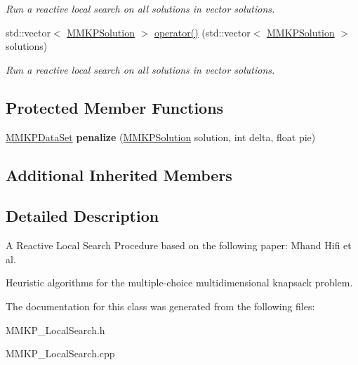 \begin{DoxyCompactItemize}
\begin{DoxyCompactList}\small\item\em Run a reactive local search on all solutions in vector solutions. \end{DoxyCompactList}\item 
\hypertarget{class_reactive_local_search_ae2a681701db9f9d907917205ab5cb7be}{std\+::vector$<$ \hyperlink{class_m_m_k_p_solution}{M\+M\+K\+P\+Solution} $>$ \hyperlink{class_reactive_local_search_ae2a681701db9f9d907917205ab5cb7be}{operator()} (std\+::vector$<$ \hyperlink{class_m_m_k_p_solution}{M\+M\+K\+P\+Solution} $>$ solutions)}\label{class_reactive_local_search_ae2a681701db9f9d907917205ab5cb7be}

\begin{DoxyCompactList}\small\item\em Run a reactive local search on all solutions in vector solutions. \end{DoxyCompactList}\end{DoxyCompactItemize}
\subsection*{Protected Member Functions}
\begin{DoxyCompactItemize}
\item 
\hypertarget{class_reactive_local_search_a68f329de1bece273f41f6613382f87ae}{\hyperlink{class_m_m_k_p_data_set}{M\+M\+K\+P\+Data\+Set} {\bfseries penalize} (\hyperlink{class_m_m_k_p_solution}{M\+M\+K\+P\+Solution} solution, int delta, float pie)}\label{class_reactive_local_search_a68f329de1bece273f41f6613382f87ae}

\end{DoxyCompactItemize}
\subsection*{Additional Inherited Members}


\subsection{Detailed Description}
A Reactive Local Search Procedure based on the following paper\+: Mhand Hifi et al. 

Heuristic algorithms for the multiple-\/choice multidimensional knapsack problem. 

The documentation for this class was generated from the following files\+:\begin{DoxyCompactItemize}
\item 
M\+M\+K\+P\+\_\+\+Local\+Search.\+h\item 
M\+M\+K\+P\+\_\+\+Local\+Search.\+cpp\end{DoxyCompactItemize}
